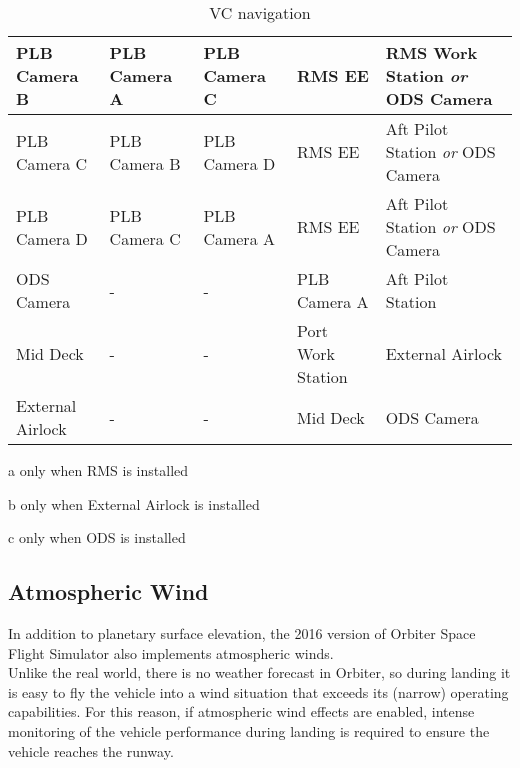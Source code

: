 \documentclass[Space_Shuttle_Vessel_Manual.tex]{subfiles}
\begin{document}
\begin{table}[H]
\begin{threeparttable}
\begin{tabular}{l|p{2.88cm} p{2.88cm} p{2.88cm} p{2.88cm} }
	\hline\rule{0pt}{2ex}
	PLB Camera B & PLB Camera A & PLB Camera C & RMS EE\tnote{a,c} & RMS Work Station \textit{or} ODS Camera\tnote{c}\\
	\hline\rule{0pt}{2ex}
	PLB Camera C & PLB Camera B & PLB Camera D & RMS EE\tnote{a,c} & Aft Pilot Station \textit{or} ODS Camera\tnote{c}\\
	\hline\rule{0pt}{2ex}
	PLB Camera D & PLB Camera C & PLB Camera A & RMS EE\tnote{a,c} & Aft Pilot Station \textit{or} ODS Camera\tnote{c}\\
	\hline\rule{0pt}{2ex}
	ODS Camera\tnote{c} & - & - & PLB Camera A & Aft Pilot Station\\
	\hline\rule{0pt}{2ex}
	Mid Deck & - & - & Port Work Station & External Airlock\tnote{b}\\
	\hline\rule{0pt}{2ex}
	External Airlock\tnote{b} & - & - & Mid Deck & ODS Camera\tnote{c}\\
  \end{tabular}
	\begin{tablenotes}
		\item[a] only when RMS is installed
		\item[b] only when External Airlock is installed
		\item[c] only when ODS is installed
	\end{tablenotes}
	\end{threeparttable}
  \caption{VC navigation}
  \label{tab:VC_navigation}
\end{table}


\begin{multicols*}{2}
\subsection{Atmospheric Wind}
In addition to planetary surface elevation, the 2016 version of Orbiter Space Flight Simulator also implements atmospheric winds.\\
Unlike the real world, there is no weather forecast in Orbiter, so during landing it is easy to fly the vehicle into a wind situation that exceeds its (narrow) operating capabilities. For this reason, if atmospheric wind effects are enabled, intense monitoring of the vehicle performance during landing is required to ensure the vehicle reaches the runway.\\
\end{multicols*}
\end{document}
